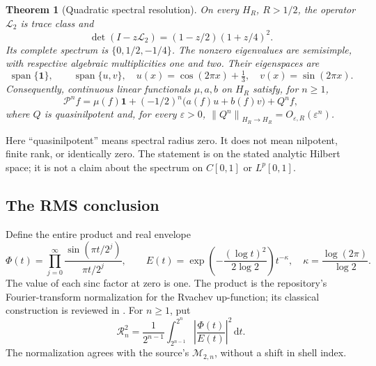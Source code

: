 \documentclass[11pt,a4paper]{article}
\newtheorem{theorem}{Theorem}[section]
\theoremstyle{definition}
\theoremstyle{remark}
\newcommand{\dd}{\,\mathrm d}
\newcommand{\one}{\mathbf 1}
\newcommand{\Lop}{\mathcal L}
\newcommand{\Pop}{\mathcal P}
\newcommand{\Span}{\operatorname{span}}
\newcommand{\abs}[1]{\left|#1\right|}
\newcommand{\norm}[1]{\left\|#1\right\|}
\numberwithin{equation}{section}
\begin{document}
\begin{theorem}[Quadratic spectral resolution]
\label{thm:intro-spectrum}
On every $H_R$, $R>1/2$, the operator $\Lop_2$ is trace class and
\begin{equation}
 \det(I-z\Lop_2)=(1-z/2)(1+z/4)^2.
 \label{eq:L2detintro}
\end{equation}
Its complete spectrum is $\{0,1/2,-1/4\}$. The nonzero eigenvalues are
semisimple, with respective algebraic multiplicities one and two. Their
eigenspaces are
\begin{equation}
 \Span\{\one\},\qquad
 \Span\{u,v\},\quad
 u(x)=\cos(2\pi x)+\tfrac13,\quad v(x)=\sin(2\pi x).
 \label{eq:uv}
\end{equation}
Consequently, continuous linear functionals $\mu,a,b$ on $H_R$ satisfy, for $n\ge1$,
\begin{equation}
 \Pop^n f=\mu(f)\one+(-1/2)^n\bigl(a(f)u+b(f)v\bigr)+Q^nf,
 \label{eq:main-decomp}
\end{equation}
where $Q$ is quasinilpotent and, for every $\varepsilon>0$,
$\norm{Q^n}_{H_R\to H_R}=O_{\varepsilon,R}(\varepsilon^n)$.
\end{theorem}

Here ``quasinilpotent'' means spectral radius zero. It does not mean
nilpotent, finite rank, or identically zero. The statement is on the stated
analytic Hilbert space; it is not a claim about the spectrum on $C[0,1]$ or
$L^p[0,1]$.

\subsection{The RMS conclusion}
Define the entire product and real envelope
\begin{equation}
 \Phi(t)=\prod_{j=0}^{\infty}\frac{\sin(\pi t/2^j)}{\pi t/2^j},\qquad
 E(t)=\exp\!\left(-\frac{(\log t)^2}{2\log2}\right)t^{-\kappa},\quad
 \kappa=\frac{\log(2\pi)}{\log2}.
 \label{eq:PhiE}
\end{equation}
The value of each sinc factor at zero is one. The product is the repository's
Fourier-transform normalization for the Rvachev up-function; its classical
construction is reviewed in \cite{arias}. For $n\ge1$, put
\begin{equation}
 \mathcal R_n^2=\frac{1}{2^{n-1}}
   \int_{2^{n-1}}^{2^n}\abs{\frac{\Phi(t)}{E(t)}}^2\dd t.
 \label{eq:RMSintro}
\end{equation}
The normalization agrees with the source's $\mathcal M_{2,n}$, without a
shift in shell index.
\end{document}
